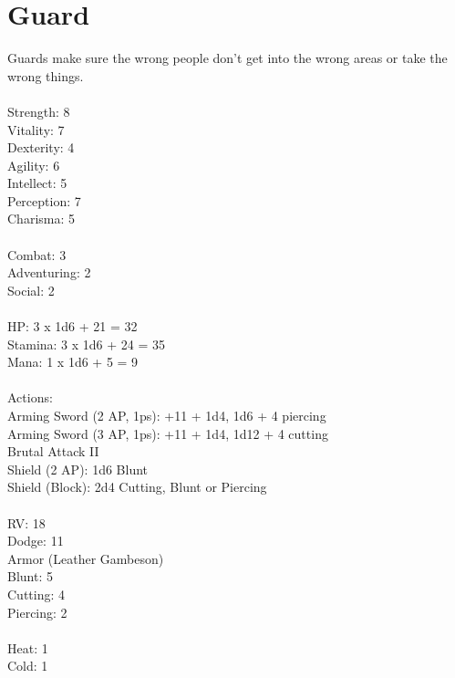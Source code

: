 \section{Guard}

Guards make sure the wrong people don't get into the wrong areas or take the wrong things.\\
\\
Strength: 8\\
Vitality: 7\\
Dexterity: 4\\
Agility: 6\\
Intellect: 5\\
Perception: 7\\
Charisma: 5\\
\\
Combat: 3\\
Adventuring: 2\\
Social: 2\\
\\
HP: 3 x 1d6 + 21 = 32\\
Stamina: 3 x 1d6 + 24 = 35\\
Mana: 1 x 1d6 + 5 = 9\\
\\
Actions:\\
Arming Sword (2 AP, 1ps): +11 + 1d4, 1d6 + 4 piercing\\
Arming Sword (3 AP, 1ps): +11 + 1d4, 1d12 + 4 cutting\\
Brutal Attack II\\
Shield (2 AP): 1d6 Blunt\\
Shield (Block): 2d4 Cutting, Blunt or Piercing\\
\\
RV: 18\\
Dodge: 11\\
Armor (Leather Gambeson)\\
Blunt: 5\\
Cutting: 4\\
Piercing: 2\\
\\
Heat: 1\\
Cold: 1\\